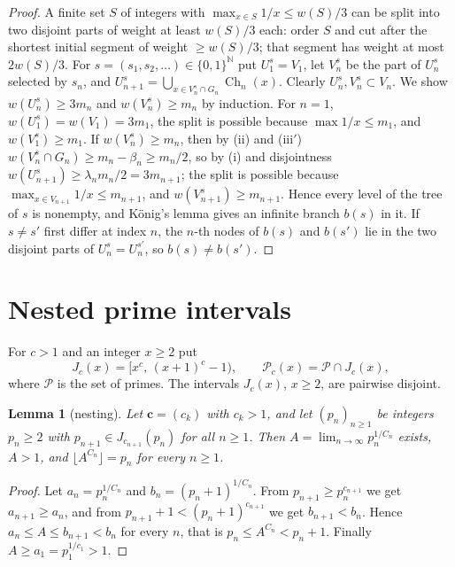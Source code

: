 \documentclass[11pt,a4paper]{article}
\newtheorem{lemma}[theorem]{Lemma}
\theoremstyle{definition}
\newcommand{\N}{\mathbb{N}}
\newcommand{\PP}{\mathcal{P}}
\newcommand{\fl}[1]{\lfloor #1\rfloor}
\newcommand{\Ch}{\operatorname{Ch}}
\begin{document}
\begin{proof}
A finite set $S$ of integers with $\max_{x\in S}1/x\le w(S)/3$ can be split into two disjoint parts of weight
at least $w(S)/3$ each: order $S$ and cut after the shortest initial segment of weight $\ge w(S)/3$; that
segment has weight at most $2w(S)/3$. For $s=(s_1,s_2,\dots)\in\{0,1\}^{\N}$ put $U_1^s=V_1$, let $V_n^s$ be the part of
$U_n^s$ selected by $s_n$, and $U_{n+1}^s=\bigcup_{x\in V_n^s\cap G_n}\Ch_n(x)$. Clearly $U_n^s,V_n^s\subset V_n$.
We show $w(U_n^s)\ge3m_n$ and $w(V_n^s)\ge m_n$ by induction. For $n=1$, $w(U_1^s)=w(V_1)=3m_1$, the split is
possible because $\max 1/x\le m_1$, and $w(V_1^s)\ge m_1$. If $w(V_n^s)\ge m_n$, then by (ii) and (iii$'$)
$w(V_n^s\cap G_n)\ge m_n-\beta_n\ge m_n/2$, so by (i) and disjointness
$w(U_{n+1}^s)\ge\lambda_n m_n/2=3m_{n+1}$; the split is possible because $\max_{x\in V_{n+1}}1/x\le m_{n+1}$, and
$w(V_{n+1}^s)\ge m_{n+1}$. Hence every level of the tree of $s$ is nonempty, and König's lemma gives an infinite
branch $b(s)$ in it. If $s\ne s'$ first differ at index $n$, the $n$-th nodes of $b(s)$ and $b(s')$ lie in the
two disjoint parts of $U_n^s=U_n^{s'}$, so $b(s)\neq b(s')$.
\end{proof}

\section{Nested prime intervals}\label{sec:nested}

For $c>1$ and an integer $x\ge2$ put
\[
 J_c(x)=\bigl[x^c,\,(x+1)^c-1\bigr),\qquad \PP_c(x)=\PP\cap J_c(x),
\]
where $\PP$ is the set of primes. The intervals $J_c(x)$, $x\ge2$, are pairwise disjoint.

\begin{lemma}[nesting]\label{lem:nest}
Let $\mathbf c=(c_k)$ with $c_k>1$, and let $(p_n)_{n\ge1}$ be integers $p_n\ge2$ with
$p_{n+1}\in J_{c_{n+1}}(p_n)$ for all $n\ge1$. Then $A=\lim_{n\to\infty}p_n^{1/C_n}$ exists, $A>1$, and
$\fl{A^{C_n}}=p_n$ for every $n\ge1$.
\end{lemma}

\begin{proof}
Let $a_n=p_n^{1/C_n}$ and $b_n=(p_n+1)^{1/C_n}$. From $p_{n+1}\ge p_n^{c_{n+1}}$ we get $a_{n+1}\ge a_n$, and
from $p_{n+1}+1<(p_n+1)^{c_{n+1}}$ we get $b_{n+1}<b_n$. Hence $a_n\le A\le b_{n+1}<b_n$ for every $n$,
that is $p_n\le A^{C_n}<p_n+1$. Finally $A\ge a_1=p_1^{1/c_1}>1$.
\end{proof}
\end{document}

